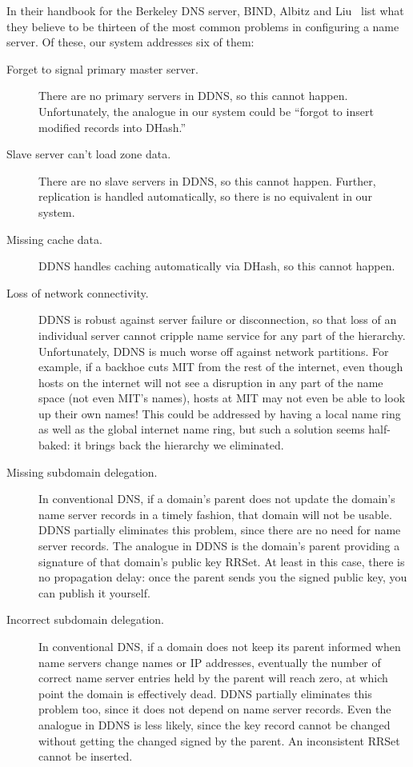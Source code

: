 In their handbook for the Berkeley DNS server, BIND,
Albitz and Liu~\cite{dns-bind} list what they believe to be
thirteen of the most common problems in configuring
a name server.
Of these, our system addresses six of them:
\begin{description}
\item[Forget to signal primary master server.]
There are no primary servers in DDNS, so this cannot happen.
Unfortunately, the analogue in our system could be ``forgot to
insert modified records into DHash.''
\item[Slave server can't load zone data.]
There are no slave servers in DDNS, so this cannot happen.
Further, replication is handled automatically, so there is no
equivalent in our system.
\item[Missing cache data.]
DDNS handles caching automatically via DHash, so this cannot happen.
\item[Loss of network connectivity.]
DDNS is robust against server failure or disconnection, so that loss of
an individual server cannot cripple name service for any part of the
hierarchy.
Unfortunately, DDNS is much worse off against network partitions.
For example, if a backhoe cuts MIT from the rest of the internet,
even though hosts on the internet will not see a disruption in any
part of the name space (not even MIT's names), hosts at MIT
may not even be able to look up their own names!
This could be addressed by having a local name ring as well
as the global internet name ring, but such a solution seems half-baked:
it brings back the hierarchy we eliminated.
\item[Missing subdomain delegation.]
In conventional DNS, if a domain's parent does not
update the domain's name server records in a timely fashion,
that domain will not be usable.  
DDNS partially eliminates this problem, since there are 
no need for name server records.
The analogue in DDNS is the domain's parent providing a signature
of that domain's public key RRSet.
At least in this case, there is no propagation delay: once the
parent sends you the signed public key, you can publish it yourself.
\item[Incorrect subdomain delegation.]
In conventional DNS, if a domain does not keep its parent informed
when name servers change names or IP addresses, eventually 
the number of correct name server entries held by the parent
will reach zero, at which point the domain is effectively dead.
DDNS partially eliminates this problem too, since it 
does not depend on name server records.
Even the analogue in DDNS is less likely, since the key record
cannot be changed without getting the changed signed by the parent.
An inconsistent RRSet cannot be inserted.
\end{description}

